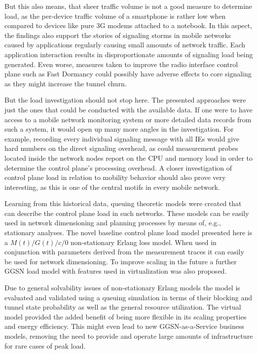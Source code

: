 But this also means, that sheer traffic volume is not a good measure to determine load, as the per-device traffic volume of a smartphone is rather low when compared to devices like pure \gls{3G} modems attached to a notebook. In this aspect, the findings also support the stories of signaling storms in mobile networks caused by applications regularly causing small amounts of network traffic. Each application interaction results in disproportionate amounts of signaling load being generated. Even worse, measures taken to improve the radio interface control plane such as Fast Dormancy could possibly have adverse effects to core signaling as they might increase the tunnel churn.

But the load investigation should not stop here. The presented approaches were just the ones that could be conducted with the available data. If one were to have access to a mobile network monitoring system or more detailed data records from such a system, it would open up many more angles in the investigation. For example, recording every individual signaling message with all \glspl{IE} would give hard numbers on the direct signaling overhead, as could measurement probes located inside the network nodes report on the CPU and memory load in order to determine the control plane's processing overhead. A closer investigation of control plane load in relation to mobility behavior should also prove very interesting, as this is one of the central motifs in every mobile network.

Learning from this historical data, queuing theoretic models were created that can describe the control plane load in such networks. These models can be easily used in network dimensioning and planning processes by means of, e.g., stationary analyses. The novel baseline control plane load model presented here is a $M(t)/G(t)/c/0$ non-stationary Erlang loss model. When used in conjunction with parameters derived from the measurement traces it can easily be used for network dimensioning. To improve scaling in the future a further \gls{GGSN} load model with features used in virtualization was also proposed.

Due to general solvability issues of non-stationary Erlang models the model is evaluated and validated using a queuing simulation in terms of their blocking and tunnel state probability as well as the general resource utilization. The virtual model provided the added benefit of being more flexible in its scaling properties and energy efficiency. This might even lead to new \gls{GGSN}-as-a-Service business models, removing the need to provide and operate large amounts of infrastructure for rare cases of peak load. 

